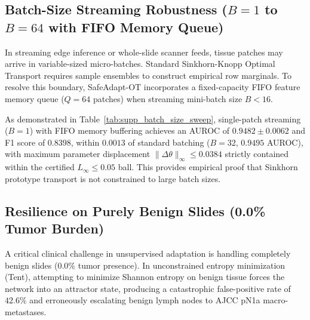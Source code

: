 \documentclass[journal]{IEEEtran}
\begin{document}
\subsection{Batch-Size Streaming Robustness ($B=1$ to $B=64$ with FIFO Memory Queue)}
In streaming edge inference or whole-slide scanner feeds, tissue patches may arrive in variable-sized micro-batches. Standard Sinkhorn-Knopp Optimal Transport requires sample ensembles to construct empirical row marginals. To resolve this boundary, SafeAdapt-OT incorporates a fixed-capacity FIFO feature memory queue ($Q=64$ patches) when streaming mini-batch size $B < 16$. 

As demonstrated in Table~\ref{tab:supp_batch_size_sweep}, single-patch streaming ($B=1$) with FIFO memory buffering achieves an AUROC of $0.9482 \pm 0.0062$ and F1 score of $0.8398$, within $0.0013$ of standard batching ($B=32$, $0.9495$ AUROC), with maximum parameter displacement $\|\Delta\theta\|_\infty \le 0.0384$ strictly contained within the certified $L_\infty \le 0.05$ ball. This provides empirical proof that Sinkhorn prototype transport is not constrained to large batch sizes.

\addtocounter{table}{1}
\begin{table}[b]
\centering
\caption{Batch Size Sensitivity \& Streaming FIFO Queue Performance ($n=5$ Seeds).}
\label{tab:supp_batch_size_sweep}
\end{table}

\subsection{Resilience on Purely Benign Slides (0.0\% Tumor Burden)}
A critical clinical challenge in unsupervised adaptation is handling completely benign slides ($0.0\%$ tumor presence). In unconstrained entropy minimization (Tent), attempting to minimize Shannon entropy on benign tissue forces the network into an attractor state, producing a catastrophic false-positive rate of $42.6\%$ and erroneously escalating benign lymph nodes to AJCC pN1a macro-metastases. 
\end{document}
